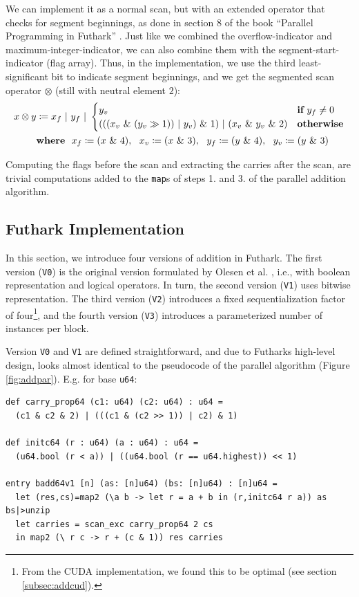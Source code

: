 We can implement it as a normal scan, but with an extended operator that checks
for segment beginnings, as done in section 8 of the book ``Parallel Programming
in Futhark'' \cite{ParallelProgrammingInFuthark}. Just like we combined the
overflow-indicator and maximum-integer-indicator, we can also combine them with
the segment-start-indicator (flag array). Thus, in the implementation, we use
the third least-significant bit to indicate segment beginnings, and we get the
segmented scan operator $\otimes$ (still with neutral element $2$):
\begin{align}
  \label{eq:segscanop}
  x \otimes y &\coloneq x_f~|~y_f~|~\begin{cases} y_v & \textbf{if}~y_f \neq 0 \\ (((x_v~\&~(y_v \gg 1))~|~y_v)~\&~1)~|~(x_v~\&~y_v~\&~2) & \textbf{otherwise}\end{cases}\\
  & \textbf{where}~~x_f\coloneq (x~\&~4),~~x_v\coloneq (x~\&~3),~~y_f\coloneq (y~\&~4),~~y_v\coloneq (y~\&~3)\notag
\end{align}

Computing the flags before the scan and extracting the carries after the scan,
are trivial computations added to the \texttt{map}s of steps 1. and 3. of the
parallel addition algorithm.

\subsection{Futhark Implementation}
\label{subsec:addfut}

In this section, we introduce four versions of addition in Futhark. The first
version (\texttt{V0}) is the original version formulated by Olesen et
al. \cite{DPPproject}, i.e., with boolean representation and logical
operators. In turn, the second version (\texttt{V1}) uses bitwise
representation. The third version (\texttt{V2}) introduces a fixed
sequentialization factor of four\footnote{From the CUDA implementation, we found
  this to be optimal (see section \ref{subsec:addcud}).}, and the fourth version
(\texttt{V3}) introduces a parameterized number of instances per block.

Version \texttt{V0} and \texttt{V1} are defined straightforward, and due to
Futharks high-level design, looks almost identical to the pseudocode of the
parallel algorithm (Figure \ref{fig:addpar}). E.g. for base \texttt{u64}:
\begin{lstlisting}[language=futhark,caption={\footnotesize Futhark addition \texttt{V1} using base \texttt{u64} (from file \texttt{add.fut} slightly edited).}]
def carry_prop64 (c1: u64) (c2: u64) : u64 =
  (c1 & c2 & 2) | (((c1 & (c2 >> 1)) | c2) & 1)

def initc64 (r : u64) (a : u64) : u64 =
  (u64.bool (r < a)) | ((u64.bool (r == u64.highest)) << 1)

entry badd64v1 [n] (as: [n]u64) (bs: [n]u64) : [n]u64 =
  let (res,cs)=map2 (\a b -> let r = a + b in (r,initc64 r a)) as bs|>unzip
  let carries = scan_exc carry_prop64 2 cs
  in map2 (\ r c -> r + (c & 1)) res carries
\end{lstlisting}

